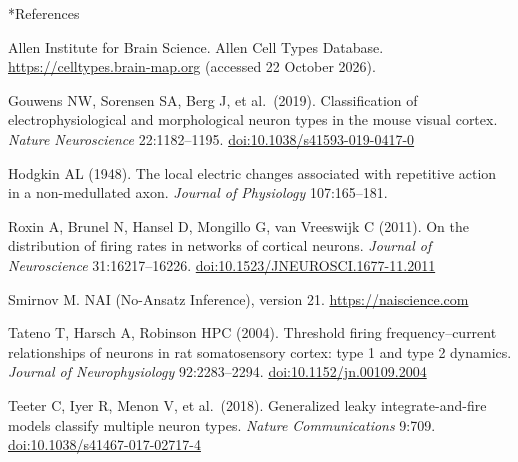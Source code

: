 \documentclass[12pt,a4paper]{article}
\makeatletter
\renewcommand\section{\@startsection{section}{1}{\z@}{-3.0ex \@plus -1ex \@minus -.2ex}{1.2ex \@plus .2ex}{\normalfont\large\bfseries}}
\makeatother
\begin{document}
\section*{References}
{\small
\setlength{\parindent}{0pt}
\setlength{\parskip}{4pt}
\raggedright

Allen Institute for Brain Science. Allen Cell Types Database. \url{https://celltypes.brain-map.org} (accessed 22 October 2026).

Gouwens NW, Sorensen SA, Berg J, et al.\ (2019). Classification of electrophysiological and morphological neuron types in the mouse visual cortex. \textit{Nature Neuroscience} 22:1182--1195. \href{https://doi.org/10.1038/s41593-019-0417-0}{doi:10.1038/s41593-019-0417-0}

Hodgkin AL (1948). The local electric changes associated with repetitive action in a non-medullated axon. \textit{Journal of Physiology} 107:165--181.

Roxin A, Brunel N, Hansel D, Mongillo G, van Vreeswijk C (2011). On the distribution of firing rates in networks of cortical neurons. \textit{Journal of Neuroscience} 31:16217--16226. \href{https://doi.org/10.1523/JNEUROSCI.1677-11.2011}{doi:10.1523/JNEUROSCI.1677-11.2011}

Smirnov M. NAI (No-Ansatz Inference), version 21. \url{https://naiscience.com}

Tateno T, Harsch A, Robinson HPC (2004). Threshold firing frequency--current relationships of neurons in rat somatosensory cortex: type 1 and type 2 dynamics. \textit{Journal of Neurophysiology} 92:2283--2294. \href{https://doi.org/10.1152/jn.00109.2004}{doi:10.1152/jn.00109.2004}

Teeter C, Iyer R, Menon V, et al.\ (2018). Generalized leaky integrate-and-fire models classify multiple neuron types. \textit{Nature Communications} 9:709. \href{https://doi.org/10.1038/s41467-017-02717-4}{doi:10.1038/s41467-017-02717-4}

}
\end{document}
